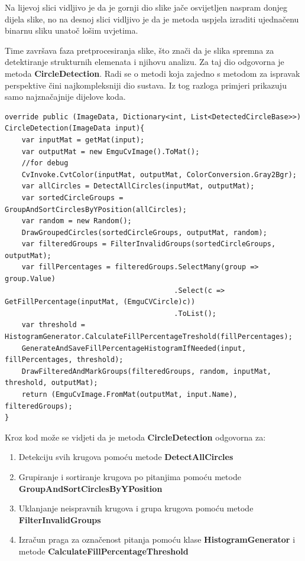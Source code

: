 \documentclass{foi}
\begin{document}
\pagebreak
Na lijevoj slici vidljivo je da je gornji dio slike jače osvijetljen naspram donjeg dijela slike, no na desnoj slici vidljivo je da je metoda uspjela izraditi ujednačenu binarnu sliku unatoč lošim uvjetima.

Time završava faza pretprocesiranja slike, što znači da je slika spremna za detektiranje strukturnih elemenata i njihovu analizu. Za taj dio odgovorna je metoda \textbf{CircleDetection}. Radi se o metodi koja zajedno s metodom za ispravak perspektive čini najkompleksniji dio sustava. Iz tog razloga primjeri prikazuju samo najznačajnije dijelove koda.

\begin{lstlisting}[caption={Metoda za detektiranje odgovora na slici}]
override public (ImageData, Dictionary<int, List<DetectedCircleBase>>) CircleDetection(ImageData input){
    var inputMat = getMat(input);
    var outputMat = new EmguCvImage().ToMat();
    //for debug
    CvInvoke.CvtColor(inputMat, outputMat, ColorConversion.Gray2Bgr);
    var allCircles = DetectAllCircles(inputMat, outputMat);
    var sortedCircleGroups = GroupAndSortCirclesByYPosition(allCircles);
    var random = new Random();
    DrawGroupedCircles(sortedCircleGroups, outputMat, random);
    var filteredGroups = FilterInvalidGroups(sortedCircleGroups, outputMat);
    var fillPercentages = filteredGroups.SelectMany(group => group.Value)
                                        .Select(c => GetFillPercentage(inputMat, (EmguCVCircle)c))
                                        .ToList();
    var threshold = HistogramGenerator.CalculateFillPercentageTreshold(fillPercentages);
    GenerateAndSaveFillPercentageHistogramIfNeeded(input, fillPercentages, threshold);
    DrawFilteredAndMarkGroups(filteredGroups, random, inputMat, threshold, outputMat);
    return (EmguCvImage.FromMat(outputMat, input.Name), filteredGroups);
}
\end{lstlisting}

Kroz kod može se vidjeti da je metoda \textbf{CircleDetection} odgovorna za:
\begin{enumerate}
    \item Detekciju svih krugova pomoću metode \textbf{DetectAllCircles}
    \item Grupiranje i sortiranje krugova po pitanjima pomoću metode \textbf{GroupAndSortCirclesByYPosition}
    \item Uklanjanje neispravnih krugova i grupa krugova pomoću metode \textbf{FilterInvalidGroups}
    \item Izračun praga za označenost pitanja pomoću klase \textbf{HistogramGenerator} i metode \textbf{CalculateFillPercentageThreshold}   
\end{enumerate}
\end{document}
